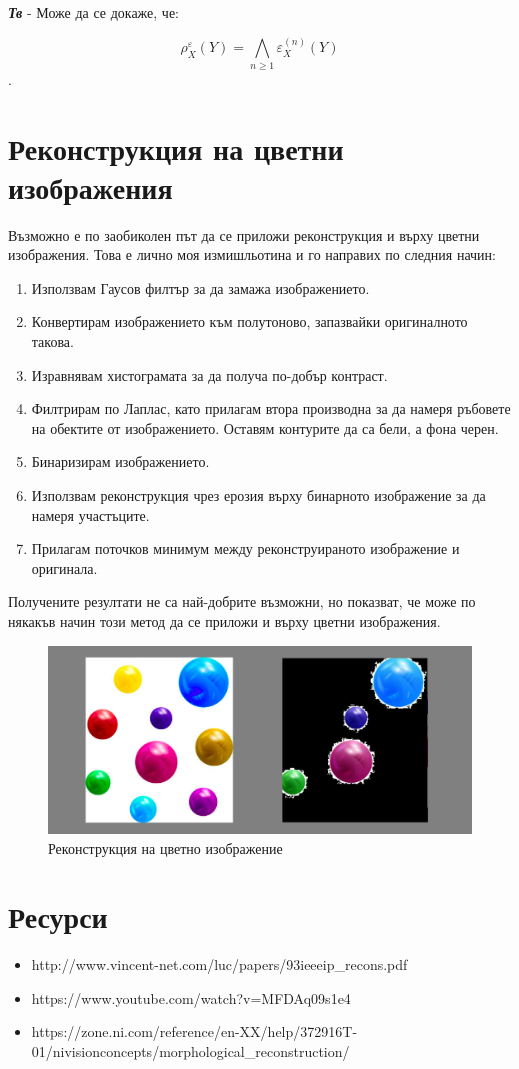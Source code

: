\documentclass[fleqn,12pt]{article}
\begin{document}
\textbf{\textit{Тв}} - Може да се докаже, че:

$$ \rho_X^\varepsilon (Y) = \bigwedge\limits_{n \geq 1} \varepsilon_X^{(n)} (Y)$$.


\section{Реконструкция на цветни изображения}

Възможно е по заобиколен път да се приложи реконструкция и върху цветни изображения. Това е лично моя измишльотина и го направих по следния начин:

\begin{enumerate}
    \item Използвам Гаусов филтър за да замажа изображението.
    \item Конвертирам изображението към полутоново, запазвайки оригиналното такова.
    \item Изравнявам хистограмата за да получа по-добър контраст.
    \item Филтрирам по Лаплас, като прилагам втора производна за да намеря ръбовете на обектите от изображението. Оставям контурите да са бели, а фона черен.
    \item Бинаризирам изображението.
    \item Използвам реконструкция чрез ерозия върху бинарното изображение за да намеря участъците.
    \item Прилагам поточков минимум между реконструираното изображение и оригинала.
\end{enumerate}

Получените резултати не са най-добрите възможни, но показват, че може по някакъв начин този метод да се приложи и върху цветни изображения.

\begin{figure}
    \centering
    \includegraphics[width=\textwidth]{img/col_rec.jpg}
    \caption{Реконструкция на цветно изображение}
    \label{fig:col_rec}
\end{figure}


\section{Ресурси}

\begin{itemize}
    \item http://www.vincent-net.com/luc/papers/93ieeeip\_recons.pdf
    \item https://www.youtube.com/watch?v=MFDAq09s1e4
    \item https://zone.ni.com/reference/en-XX/help/372916T-01/nivisionconcepts/morphological\_reconstruction/
\end{itemize}
\end{document}
